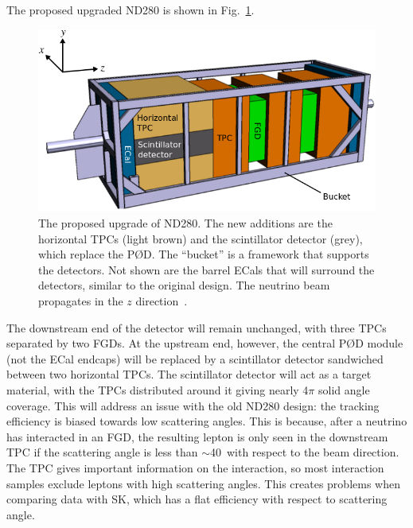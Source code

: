 \documentclass[aps,pra,12pt,notitlepage,tightenlines]{revtex4-1}
\begin{document}
The proposed upgraded ND280 is shown in Fig.\ \ref{fig:up}.
\begin{figure}
 \includegraphics[scale=0.5]{upgrade2.png}
 \caption{The proposed upgrade of ND280. The new additions are the horizontal TPCs (light brown) and the scintillator detector (grey), which replace the P\O D. The ``bucket'' is a framework that supports the detectors. Not shown are the barrel ECals that will surround the detectors, similar to the original design. The neutrino beam propagates in the $z$ direction~\cite{Blondel:2299599}.}
 \label{fig:up}
\end{figure}
The downstream end of the detector will remain unchanged, with three TPCs separated by two FGDs. At the upstream end, however, the central P\O D module (not the ECal endcaps) will be replaced by a scintillator detector sandwiched between two horizontal TPCs. The scintillator detector will act as a target material, with the TPCs distributed around it giving nearly 4$\pi$ solid angle coverage. This  will address an issue with the old ND280 design: the tracking efficiency is biased towards low scattering angles. This is because, after a neutrino has interacted in an FGD, the resulting lepton is only seen in the downstream TPC if the scattering angle is less than $\sim$40\degree\ with respect to the beam direction. The TPC gives important information on the interaction, so most interaction samples exclude leptons with high scattering angles. This creates problems when comparing data with SK, which has a flat efficiency with respect to scattering angle.
\end{document}
